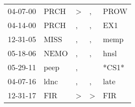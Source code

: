 \begin{supertabular}{p{0.07\textwidth}p{0.06\textwidth}p{0.02\textwidth}p{0.02\textwidth}p{0.06\textwidth}}
 04-07-00\textsuperscript{} &  PRCH\textsuperscript{} &  \textgreater &             , &  PROW\textsuperscript{} \\
 04-14-00\textsuperscript{} &  PRCH\textsuperscript{} &             , &             , &   EX1\textsuperscript{} \\
 12-31-05\textsuperscript{} &  MISS\textsuperscript{} &             , &             , &  memp\textsuperscript{} \\
 05-18-06\textsuperscript{} &  NEMO\textsuperscript{} &             , &             , &  hnsl\textsuperscript{} \\
 05-29-11\textsuperscript{} &  peep\textsuperscript{} &             , &               &                   *CS1* \\
 04-07-16\textsuperscript{} &  ldnc\textsuperscript{} &             , &             , &  late\textsuperscript{} \\
 12-31-17\textsuperscript{} &   FIR\textsuperscript{} &  \textgreater &  \textgreater &   FIR\textsuperscript{} \\
\end{supertabular}
